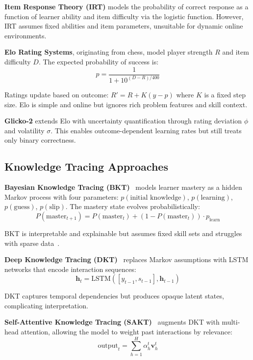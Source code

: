 \documentclass[conference]{IEEEtran}
\begin{document}
\textbf{Item Response Theory (IRT)} models the probability of correct response as a function of learner ability and item difficulty via the logistic function. However, IRT assumes fixed abilities and item parameters, unsuitable for dynamic online environments.

\textbf{Elo Rating Systems}, originating from chess, model player strength $R$ and item difficulty $D$. The expected probability of success is:
\begin{equation}
p = \frac{1}{1 + 10^{(D - R)/400}}
\end{equation}

Ratings update based on outcome: $R' = R + K(y - p)$ where $K$ is a fixed step size. Elo is simple and online but ignores rich problem features and skill context.

\textbf{Glicko-2} extends Elo with uncertainty quantification through rating deviation $\phi$ and volatility $\sigma$. This enables outcome-dependent learning rates but still treats only binary correctness.

\subsection{Knowledge Tracing Approaches}

\textbf{Bayesian Knowledge Tracing (BKT)}~\cite{corbett1994bkt} models learner mastery as a hidden Markov process with four parameters: $p(\text{initial knowledge})$, $p(\text{learning})$, $p(\text{guess})$, $p(\text{slip})$. The mastery state evolves probabilistically:
\begin{equation}
P(\text{master}_{t+1}) = P(\text{master}_t) + (1 - P(\text{master}_t)) \cdot p_{\text{learn}}
\end{equation}

BKT is interpretable and explainable but assumes fixed skill sets and struggles with sparse data~\cite{waters2015bkt_limitations}.

\textbf{Deep Knowledge Tracing (DKT)}~\cite{piech2015dkt} replaces Markov assumptions with LSTM networks that encode interaction sequences:
\begin{equation}
\mathbf{h}_t = \text{LSTM}([y_{t-1}, s_{t-1}], \mathbf{h}_{t-1})
\end{equation}

DKT captures temporal dependencies but produces opaque latent states, complicating interpretation.

\textbf{Self-Attentive Knowledge Tracing (SAKT)}~\cite{pandey2019sakt} augments DKT with multi-head attention, allowing the model to weight past interactions by relevance:
\begin{equation}
\text{output}_t = \sum_{h=1}^{H} \alpha_h^t \mathbf{v}_h^t
\end{equation}
\end{document}
